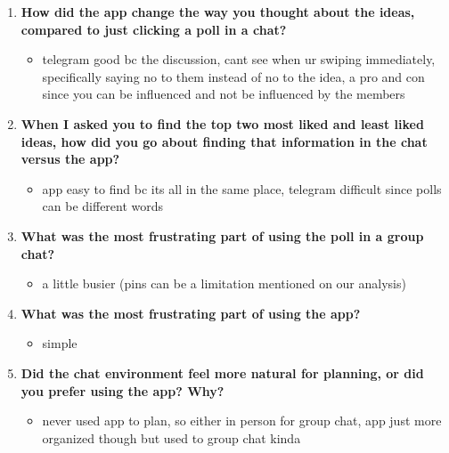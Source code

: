 \documentclass[12pt,a4paper]{article}
\begin{document}
\begin{enumerate}
    \item \textbf{How did the app change the way you thought about the ideas, compared to just clicking a poll in a chat?}
    
    \begin{itemize}
        \item telegram good bc the discussion, cant see when ur swiping immediately, specifically saying no to them instead of no to the idea, a pro and con since you can be influenced and not be influenced by the members
    \end{itemize}
    
    \item \textbf{When I asked you to find the top two most liked and least liked ideas, how did you go about finding that information in the chat versus the app?}
    
    \begin{itemize}
        \item app easy to find bc its all in the same place, telegram difficult since polls can be different words
    \end{itemize}
    
    \item \textbf{What was the most frustrating part of using the poll in a group chat?}
    
    \begin{itemize}
        \item a little busier (pins can be a limitation mentioned on our analysis)
    \end{itemize}
    
    \item \textbf{What was the most frustrating part of using the app?}
    
    \begin{itemize}
        \item simple
    \end{itemize}
    
    \item \textbf{Did the chat environment feel more natural for planning, or did you prefer using the app? Why?}
    
    \begin{itemize}
        \item never used app to plan, so either in person for group chat, app just more organized though but used to group chat kinda
    \end{itemize}
\end{enumerate}
\end{document}
